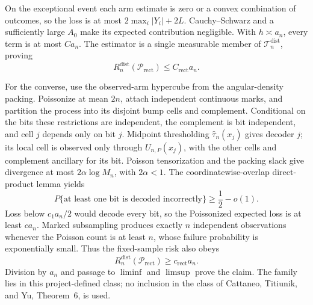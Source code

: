 On the exceptional event each arm estimate is zero or a convex combination of
outcomes, so the loss is at most \(2\max_i|Y_i|+2L\).  Cauchy--Schwarz and a
sufficiently large \(A_0\) make its expected contribution negligible.  With
\(h\asymp a_n\), every term is at most \(Ca_n\).  The estimator is a single
measurable member of \(\mathcal T_n^{\mathrm{dist}}\), proving
\[
 R_n^{\mathrm{dist}}(\mathcal P_{\mathrm{rect}})\leq C_{\mathrm{rect}}a_n.
\]

For the converse, use the observed-arm hypercube from the angular-density
packing.  Poissonize at mean \(2n\), attach independent continuous marks, and
partition the process into its disjoint bump cells and complement.  Conditional
on the bits these restrictions are independent, the complement is bit
independent, and cell \(j\) depends only on bit \(j\).  Midpoint thresholding
\(\widehat\tau_n(x_j)\) gives decoder \(j\); its local cell is observed only
through \(U_{n,P}(x_j)\), with the other cells and complement ancillary for its
bit.  Poisson tensorization and the packing slack give divergence at most
\(2\alpha\log M_n\), with \(2\alpha<1\).  The coordinatewise-overlap
direct-product lemma yields
\[
 P\{\text{at least one bit is decoded incorrectly}\}\geq\frac12-o(1).
\]
Loss below \(c_1a_n/2\) would decode every bit, so the Poissonized expected
loss is at least \(ca_n\).  Marked subsampling produces exactly \(n\)
independent observations whenever the Poisson count is at least \(n\), whose
failure probability is exponentially small.  Thus the fixed-sample risk also
obeys
\[
 R_n^{\mathrm{dist}}(\mathcal P_{\mathrm{rect}})\geq c_{\mathrm{rect}}a_n.
\]
Division by \(a_n\) and passage to \(\liminf\) and \(\limsup\) prove the
claim.  The family lies in this project-defined class; no inclusion in the class
of Cattaneo, Titiunik, and Yu, Theorem~6, is used.